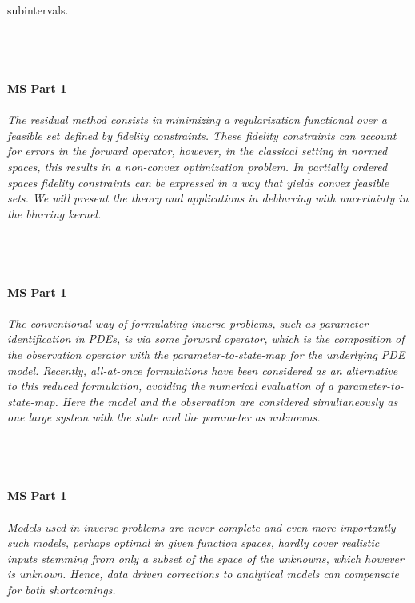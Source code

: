 \begin{multicols}{2}
{subintervals.}\\
\\ 
    \\
    \\\\
    \noindent\textbf{MS Part 1}\\
\\  
    \textit{The residual method consists in minimizing a regularization functional over a feasible set defined by fidelity constraints. These fidelity constraints can account for errors in the forward operator, however, in the classical setting in normed spaces, this results in a non-convex optimization problem. In partially ordered spaces fidelity constraints can be expressed in a way that yields convex feasible sets. We will present the theory and applications in deblurring with uncertainty in the blurring kernel.}\\
\\ 
    \\
    \\\\
    \noindent\textbf{MS Part 1}\\
\\  
    \textit{The conventional way of formulating inverse problems, such as parameter identification in PDEs, is via some forward operator, which is the composition of the observation operator with the parameter-to-state-map for the underlying PDE model. Recently, all-at-once formulations have been considered as an alternative to this reduced formulation, avoiding the numerical evaluation of a parameter-to-state-map. Here the model and the observation are considered simultaneously as one large system with the state and the parameter as unknowns.}\\
\\ 
    \\
    \\\\
    \noindent\textbf{MS Part 1}\\
\\  
    \textit{Models used in inverse problems are never complete and even more importantly such models, perhaps optimal in given function spaces, hardly cover realistic inputs stemming from only a subset of the space of the unknowns, which however is unknown. Hence, data driven corrections to analytical models can compensate for both shortcomings.
}
\end{multicols}
